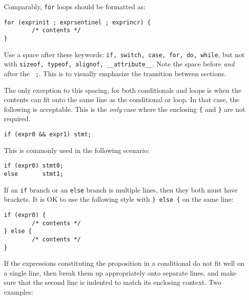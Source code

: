 \documentclass[11pt,onecolumn]{article}
\newcommand{\head}[1]{\vspace{0.4em}\noindent{\bf #1}}
\begin{document}
Comparably, {\tt for} loops should be formatted as:

    \begin{minipage}{3in}
      \footnotesize
      \lstset{language=C}
      \begin{lstlisting}
for (exprinit ; exprsentinel ; exprincr) {
        /* contents */
}
      \end{lstlisting}
    \end{minipage}

Use a space after these keywords: {\tt if, switch, case, for, do,
  while}, but not with {\tt sizeof, typeof, alignof,
  \_\_attribute\_\_}.  Note the space before {\em and} after the {\tt
  ;}.  This is to visually emphasize the transition between sections.

The only exception to this spacing, for both conditionals and loops is
when the contents can fit onto the same line as the conditional or
loop.  In that case, the following is acceptable.  This is the {\em
  only} case where the enclosing {\tt \{} and {\tt \}} are not
required.

    \begin{minipage}{3in}
      \footnotesize
      \lstset{language=C}
      \begin{lstlisting}
if (expr0 && expr1) stmt;
      \end{lstlisting}
    \end{minipage}

This is commonly used in the following scenario:

    \begin{minipage}{3in}
      \footnotesize
      \lstset{language=C}
      \begin{lstlisting}
if (expr0) stmt0;
else       stmt1;
      \end{lstlisting}
    \end{minipage}

If an {\tt if} branch or an {\tt else} branch is multiple lines, then
they both must have brackets.  It is OK to use the following style
with {\tt \} else \{} on the same line:

    \begin{minipage}{3in}
      \footnotesize
      \lstset{language=C}
      \begin{lstlisting}
if (expr0) {
        /* contents */
} else {
        /* contents */
}
      \end{lstlisting}
    \end{minipage}


\head{Breaking up lines.}  If the expressions constituting the
proposition in a conditional do not fit well on a single line, then
break them up appropriately onto separate lines, and make sure that
the second line is indented to match its enclosing context.  Two
examples:
\end{document}
